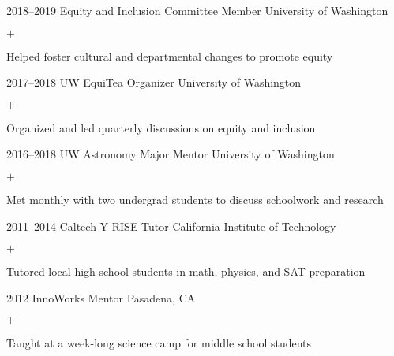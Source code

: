 \documentclass[]{luger-cv} %
\begin{document}
\begin{entrylist}
\entry
{2018--2019}
{Equity and Inclusion Committee Member}
{University of Washington}
{%
\vspace{-1em}
\begin{list}{$+$}{\cvlist}
\item Helped foster cultural and departmental changes to promote equity
\end{list}
}

\entry
{2017--2018}
{UW EquiTea Organizer}
{University of Washington}
{%
\vspace{-1em}
\begin{list}{$+$}{\cvlist}
\item Organized and led quarterly discussions on equity and inclusion
\end{list}
}


\entry
{2016--2018}
{UW Astronomy Major Mentor}
{University of Washington}
{%
\vspace{-1em}
\begin{list}{$+$}{\cvlist}
\item Met monthly with two undergrad students to discuss schoolwork and research
\end{list}
}


\ifdefined \onepage \else
\end{entrylist}
%
%
\begin{entrylist}
\fi


\entry
{2011--2014}
{Caltech Y RISE Tutor}
{California Institute of Technology}
{%
\vspace{-1em}
\begin{list}{$+$}{\cvlist}
\item Tutored local high school students in math, physics, and SAT preparation
\end{list}
}

%

\ifdefined \onepage \else
\entry
{2012}
{InnoWorks Mentor}
{Pasadena, CA}
{%
\vspace{-1em}
\begin{list}{$+$}{\cvlist}
\item Taught at a week-long science camp for middle school students
\end{list}
}
\fi


\end{entrylist}
\end{document}
